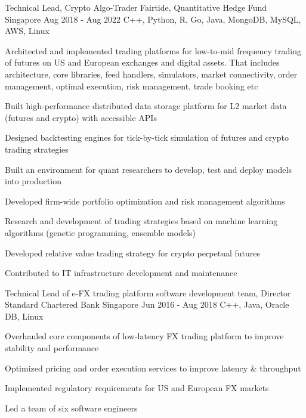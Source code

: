 \begin{cventries}
  \cventry
    {Technical Lead, Crypto Algo-Trader} %
    {Fairtide, Quantitative Hedge Fund} %
    {Singapore} %
    {Aug 2018 - Aug 2022} %
    {C++, Python, R, Go, Java, MongoDB, MySQL, AWS, Linux}
    {
      \begin{cvitems} %
        \item {Architected and implemented trading platforms for low-to-mid frequency trading of futures on US and European exchanges and digital assets. That includes architecture, core libraries, feed handlers, simulators, market connectivity, order management, optimal execution, risk management, trade booking etc}
        \item {Built high-performance distributed data storage platform for L2 market data (futures and crypto) with accessible APIs}
        \item {Designed backtesting engines for tick-by-tick simulation of futures and crypto trading strategies}
        \item {Built an environment for quant researchers to develop, test and deploy models into production}
        \item {Developed firm-wide portfolio optimization and risk management algorithms}
        \item {Research and development of trading strategies based on machine learning algorithms (genetic programming, ensemble models)}
        \item {Developed relative value trading strategy for crypto perpetual futures}
        \item {Contributed to IT infrastructure development and maintenance}
      \end{cvitems}
    }

  \cventry
    {Technical Lead of e-FX trading platform software development team, Director} %
    {Standard Chartered Bank} %
    {Singapore} %
    {Jun 2016 - Aug 2018} %
    {C++, Java, Oracle DB, Linux}
    {
      \begin{cvitems} %
        \item {Overhauled core components of low-latency FX trading platform to improve stability and performance}
        \item {Optimized pricing and order execution services to improve latency \& throughput}
        \item {Implemented regulatory requirements for US and European FX markets}
        \item {Led a team of six software engineers}
      \end{cvitems}
    }


\end{cventries}

